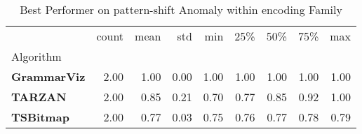 \begin{table}
\caption{Best Performer on pattern-shift Anomaly within encoding Family}
\label{tab:bp-pattern-shift_encoding}
\begin{tabular}{lrrrrrrrr}
\toprule
 & count & mean & std & min & 25\% & 50\% & 75\% & max \\
Algorithm &  &  &  &  &  &  &  &  \\
\midrule
\textbf{GrammarViz} & 2.00 & 1.00 & 0.00 & 1.00 & 1.00 & 1.00 & 1.00 & 1.00 \\
\textbf{TARZAN} & 2.00 & 0.85 & 0.21 & 0.70 & 0.77 & 0.85 & 0.92 & 1.00 \\
\textbf{TSBitmap} & 2.00 & 0.77 & 0.03 & 0.75 & 0.76 & 0.77 & 0.78 & 0.79 \\
\bottomrule
\end{tabular}
\end{table}
